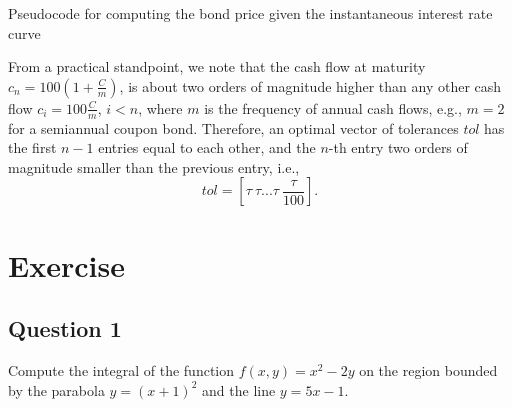 \begin{algorithm}
    \caption{Pseudocode for computing the bond price given the instantaneous
        interest rate curve}
    \label{alg:bond-price-numerical-int}
    \begin{algorithmic}

        \State{}


        \State{}

        \EndFor
    \end{algorithmic}
\end{algorithm}

From a practical standpoint, we note that the cash flow at maturity
    $ c_n = 100 \left( 1 + \frac{C}{m} \right) $, is about two orders of
    magnitude higher than any other cash flow $ c_i = 100 \frac{C}{m} $,
    $ i < n $, where $ m $ is the frequency of annual cash flows, e.g.,
    $ m = 2 $ for a semiannual coupon bond.
Therefore, an optimal vector of tolerances $ tol $ has the first $ n - 1 $
    entries equal to each other, and the $ n $-th entry two orders of
    magnitude smaller than the previous entry, i.e.,
\begin{equation*}
    tol = \left[ \tau\ \tau ... \tau\ \frac{\tau}{100} \right].
\end{equation*}

\section{Exercise}

\subsection{Question 1}
Compute the integral of the function $ f(x, y) = x^2 - 2 y $ on the region
    bounded by the parabola $ y = (x + 1)^2 $ and the line $ y = 5 x - 1 $.

